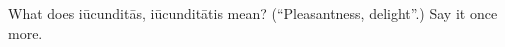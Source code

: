 \begin{tcolorbox}[breakable,colback=teal!4,colframe=teal!35!black,title={Before you move on}]
What does iūcunditās, iūcunditātis mean? (\textquotedblleft{}Pleasantness, delight\textquotedblright{}.) Say it once more.
\end{tcolorbox}
